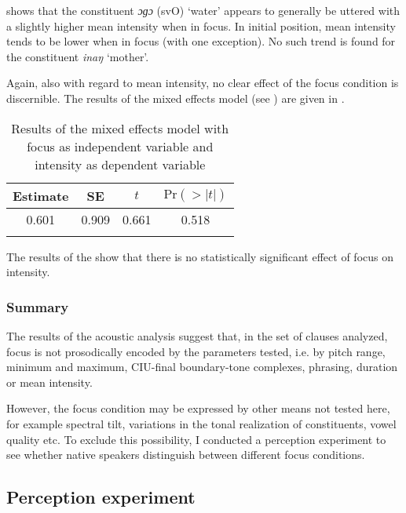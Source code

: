  shows that  the constituent \textit{ɔɡɔ} (svO) `water'  appears to generally be uttered with a slightly higher mean intensity when in focus. In initial position,  mean intensity tends to be lower when in focus (with one exception). No such trend is found for the constituent \textit{inaŋ} ‘mother’.

Again, also with regard to mean intensity, no clear effect of the focus condition is discernible. The results of the mixed effects model (see ) are given in  	.

\begin{table}
	\caption{Results of the mixed effects model with focus as independent variable and intensity as dependent variable}
	\label{lmer_intens}
	\begin{tabular}{cccc}
		\lsptoprule
		Estimate   & SE & $t$  & $\text{Pr}(>|t|)$ \\
		\midrule
		0.601 & 0.909 & 0.661& 0.518    \\
		\lspbottomrule     
	\end{tabular}
\end{table}



The results of the  show that there is no statistically significant effect of focus on intensity. 



\subsubsection{Summary}

The results of the acoustic analysis suggest that, in the set of clauses analyzed, focus is not prosodically encoded by the parameters tested, i.e. by pitch range, minimum and maximum, CIU-final boundary-tone complexes, phrasing, duration or mean intensity. 

However, the focus condition may be expressed by other means not tested here, for example spectral tilt, variations in the tonal realization of constituents, vowel quality etc. To exclude this possibility, I conducted a perception experiment to see whether native speakers distinguish between different focus conditions.

\subsection{Perception experiment}
\label{sec:Fokus-perception}


